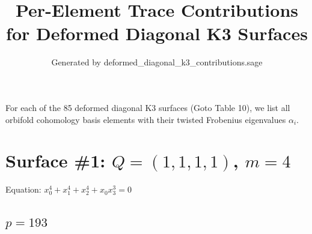 \documentclass[11pt]{article}
\begin{document}
\title{Per-Element Trace Contributions for Deformed Diagonal K3 Surfaces}
\author{Generated by deformed\_diagonal\_k3\_contributions.sage}
\maketitle

For each of the 85 deformed diagonal K3 surfaces (Goto Table 10), we list all orbifold
cohomology basis elements with their twisted Frobenius eigenvalues $\alpha_i$.


\section*{Surface \#1: $Q=(1, 1, 1, 1)$, $m=4$}

Equation: $x_0^{4} + x_1^{4} + x_2^{4} + x_0 x_3^{3} = 0$

\subsection*{$p = 193$}
\end{document}
